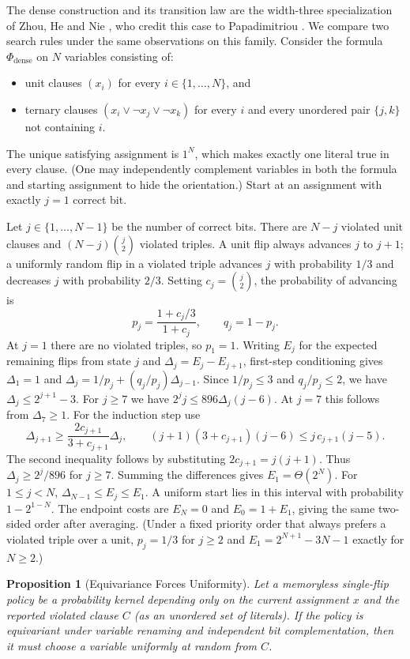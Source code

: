 \documentclass[11pt,a4paper]{article}
\newtheorem{proposition}[theorem]{Proposition}
\theoremstyle{definition}
\theoremstyle{remark}
\begin{document}
The dense construction and its transition law are the width-three specialization of Zhou, He and Nie \cite[Definition~2 and Proposition~2]{zhou2009}, who credit this case to Papadimitriou \cite{papadimitriou1991}. We compare two search rules under the same observations on this family. Consider the formula $\Phi_{\mathrm{dense}}$ on $N$ variables consisting of:
\begin{itemize}
    \item unit clauses $(x_i)$ for every $i \in \{1,\dots,N\}$, and
    \item ternary clauses $(x_i \lor \neg x_j \lor \neg x_k)$ for every $i$ and every unordered pair $\{j,k\}$ not containing $i$.
\end{itemize}
The unique satisfying assignment is $1^N$, which makes exactly one literal true in every clause. (One may independently complement variables in both the formula and starting assignment to hide the orientation.) Start at an assignment with exactly $j=1$ correct bit.

Let $j \in \{1,\dots,N-1\}$ be the number of correct bits. There are $N-j$ violated unit clauses and $(N-j)\binom{j}{2}$ violated triples. A unit flip always advances $j$ to $j+1$; a uniformly random flip in a violated triple advances $j$ with probability $1/3$ and decreases $j$ with probability $2/3$. Setting $c_j = \binom{j}{2}$, the probability of advancing is
\[
    p_j = \frac{1 + c_j/3}{1 + c_j}, \qquad q_j = 1 - p_j.
\]
At $j=1$ there are no violated triples, so $p_1 = 1$. Writing $E_j$ for the expected remaining flips from state $j$ and $\Delta_j = E_j - E_{j+1}$, first-step conditioning gives $\Delta_1 = 1$ and $\Delta_j = 1/p_j + (q_j/p_j)\Delta_{j-1}$. Since $1/p_j \le 3$ and $q_j/p_j \le 2$, we have $\Delta_j \le 2^{j+1}-3$. For $j\ge7$ we have $2^j j\le896\Delta_j(j-6)$. At $j=7$ this follows from $\Delta_7\ge1$. For the induction step use
\[
 \Delta_{j+1}\ge\frac{2c_{j+1}}{3+c_{j+1}}\Delta_j,\qquad
 (j+1)(3+c_{j+1})(j-6)\le j\,c_{j+1}(j-5).
\]
The second inequality follows by substituting $2c_{j+1}=j(j+1)$. Thus $\Delta_j\ge2^j/896$ for $j\ge7$. Summing the differences gives $E_1=\Theta(2^N)$. For $1\le j<N$, $\Delta_{N-1}\le E_j\le E_1$. A uniform start lies in this interval with probability $1-2^{1-N}$. The endpoint costs are $E_N=0$ and $E_0=1+E_1$, giving the same two-sided order after averaging. (Under a fixed priority order that always prefers a violated triple over a unit, $p_j = 1/3$ for $j \ge 2$ and $E_1 = 2^{N+1} - 3N - 1$ exactly for $N \ge 2$.)

\begin{proposition}[Equivariance Forces Uniformity]\label{prop:equiv}
Let a memoryless single-flip policy be a probability kernel depending only on the current assignment $x$ and the reported violated clause $C$ (as an unordered set of literals). If the policy is equivariant under variable renaming and independent bit complementation, then it must choose a variable uniformly at random from $C$.
\end{proposition}
\end{document}
